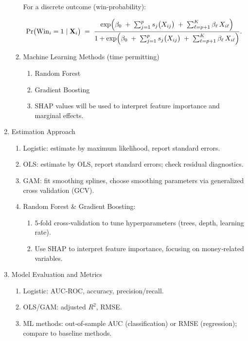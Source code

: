 \documentclass[12pt]{article}
\begin{document}
\begin{enumerate}[label=\Alph*.]
\begin{enumerate}[label=\arabic*)]
For a discrete outcome (win-probability): 

\[
\Pr\bigl(\mathrm{Win}_i = 1 \mid \mathbf{X}_i \bigr)
\;=\;
\frac{\exp\Bigl(\beta_{0} \;+\; \sum_{j=1}^{p} s_{j}\bigl(X_{ij}\bigr) \;+\; \sum_{\ell=p+1}^{K} \beta_{\ell}\,X_{i\ell}\Bigr)}
{1 + \exp\Bigl(\beta_{0} \;+\; \sum_{j=1}^{p} s_{j}\bigl(X_{ij}\bigr) \;+\; \sum_{\ell=p+1}^{K} \beta_{\ell}\,X_{i\ell}\Bigr)}.
\]

        \item Machine Learning Methods (time permitting)
        \begin{enumerate}[label=\alph*)]
            \item Random Forest
            \item Gradient Boosting
            \item SHAP values will be used to interpret feature importance and marginal effects.
        \end{enumerate}
        \end{enumerate}
            

    \item Estimation Approach
    \begin{enumerate}[label=\arabic*)]
      \item Logistic: estimate by maximum likelihood, report standard errors.
      \item OLS: estimate by OLS, report standard errors; check residual diagnostics.
      \item GAM: fit smoothing splines, choose smoothing parameters via generalized cross validation (GCV).
      \item Random Forest \& Gradient Boosting:  
        \begin{enumerate}[label=\alph*)]
          \item 5‑fold cross‐validation to tune hyperparameters (trees, depth, learning rate).
          \item Use SHAP to interpret feature importance, focusing on money‐related variables.
        \end{enumerate}
    \end{enumerate}

    \item Model Evaluation and Metrics
    \begin{enumerate}[label=\arabic*)]
      \item Logistic: AUC‑ROC, accuracy, precision/recall.
      \item OLS/GAM: adjusted \(R^2\), RMSE.
      \item ML methods: out‑of‑sample AUC (classification) or RMSE (regression); compare to baseline methods.
    \end{enumerate}
        

\end{enumerate}
\end{document}
